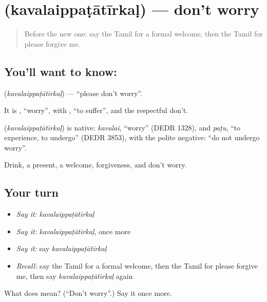 \section[\texorpdfstring{\ta{கவலைப்படாதீர்கள்} (kavalaippaṭātīrkaḷ)}{கவலைப்படாதீர்கள் (kavalaippaṭātīrkaḷ)}]{ (kavalaippaṭātīrkaḷ) — don't worry}

\label{lesson:TA-C99-dontworry}



\begin{quote}
Before the new one: say the Tamil for a formal welcome, then the Tamil for please forgive me.
\end{quote}

\subsection*{You'll want to know: }
\textbf{} (\emph{kavalaippaṭātīrkaḷ}) — \textquotedblleft{}please don't worry\textquotedblright{}.

It is \textbf{}, \textquotedblleft{}worry\textquotedblright{}, with \textbf{}, \textquotedblleft{}to suffer\textquotedblright{}, and the respectful don't.

\begin{cousinweb}
\textbf{} (\emph{kavalaippaṭātīrkaḷ}) is native: \emph{kavalai}, \textquotedblleft{}worry\textquotedblright{} (DEDR 1328), and \emph{paṭu}, \textquotedblleft{}to experience, to undergo\textquotedblright{} (DEDR 3853), with the polite negative: \textquotedblleft{}do not undergo worry\textquotedblright{}.
\end{cousinweb}

\begin{grammarlens}[title={What you've built}]
Drink, a present, a welcome, forgiveness, and don't worry.
\end{grammarlens}

\subsection*{Your turn}
\begin{itemize}
\raggedright
  \item \emph{Say it:} \emph{kavalaippaṭātīrkaḷ}
  \item \emph{Say it:} \emph{kavalaippaṭātīrkaḷ}, once more
  \item \emph{Say it:} say \emph{kavalaippaṭātīrkaḷ}
  \item \emph{Recall:} say the Tamil for a formal welcome, then the Tamil for please forgive me, then say \emph{kavalaippaṭātīrkaḷ} again
\end{itemize}

\begin{tcolorbox}[breakable,colback=teal!4,colframe=teal!35!black,title={Before you move on}]
What does  mean? (\textquotedblleft{}Don't worry\textquotedblright{}.) Say it once more.
\end{tcolorbox}
